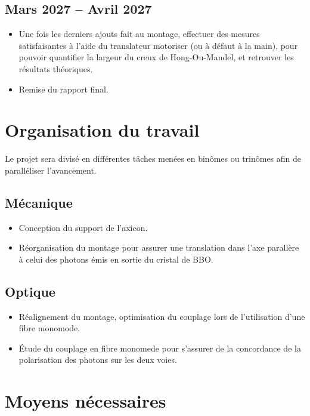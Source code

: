 \documentclass[a4paper, 12pt]{article}
\begin{document}
\subsection{Mars 2027 -- Avril 2027}

\begin{itemize}
    \item Une fois les derniers ajouts fait au montage, effectuer des mesures satisfaisantes à l’aide du translateur motoriser (ou à défaut à la main), pour pouvoir quantifier la largeur du creux de Hong-Ou-Mandel, et retrouver les résultats théoriques.
    \item Remise du rapport final.
\end{itemize}

\clearpage

\section{Organisation du travail}

Le projet sera divisé en différentes tâches menées en binômes ou trinômes afin de paralléliser l’avancement.

\subsection{Mécanique}

\begin{itemize}
    \item Conception du support de l’axicon.
    \item Réorganisation du montage pour assurer une translation dans l’axe parallère à celui des photons émis en sortie du cristal de BBO.
\end{itemize}

\subsection{Optique}

\begin{itemize}
    \item Réalignement du montage, optimisation du couplage lors de l’utilisation d’une fibre monomode.
    \item Étude du couplage en fibre monomede pour s’assurer de la concordance de la polarisation des photons sur les deux voies.
\end{itemize}

\section{Moyens nécessaires}
\end{document}
